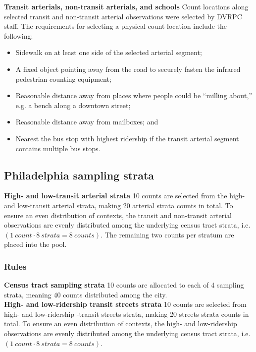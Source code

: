 \documentclass[paper=letterpaper, fontsize=11pt]{scrartcl}
\begin{document}
\textbf{Transit arterials, non-transit arterials, and schools} Count locations along selected transit and non-transit arterial observations were selected by DVRPC staff. The requirements for selecting a physical count location include the following:
\begin{itemize}[itemsep=-4pt]
	\item Sidewalk on at least one side of the selected arterial segment;
	\item A fixed object pointing away from the road to securely fasten the infrared pedestrian counting equipment;
	\item Reasonable distance away from places where people could be ``milling about,'' e.g. a bench along a downtown street;
	\item Reasonable distance away from mailboxes; and
	\item Nearest the bus stop with highest ridership if the transit arterial segment contains multiple bus stops.
\end{itemize}

\subsection{Philadelphia sampling strata}
\textbf{High- and low-transit arterial strata} 10 counts are selected from the high- and low-transit arterial strata, making 20 arterial strata counts in total. To ensure an even distribution of contexts, the transit and non-transit arterial observations are evenly distributed among the underlying census tract strata, i.e. $\left(1\:count \cdot 8\: strata = 8 \: counts\right)$. The remaining two counts per stratum are placed into the pool. \\

\subsubsection{Rules}

\textbf{Census tract sampling strata} 10 counts are allocated to each of 4 sampling strata, meaning 40 counts distributed among the city. \\

\textbf{High- and low-ridership transit streets strata} 10 counts are selected from high- and low-ridership -transit streets strata, making 20 streets strata counts in total. To ensure an even distribution of contexts, the high- and low-ridership observations are evenly distributed among the underlying census tract strata, i.e. $\left(1\:count \cdot 8\: strata = 8 \: counts\right)$. \\
\end{document}

